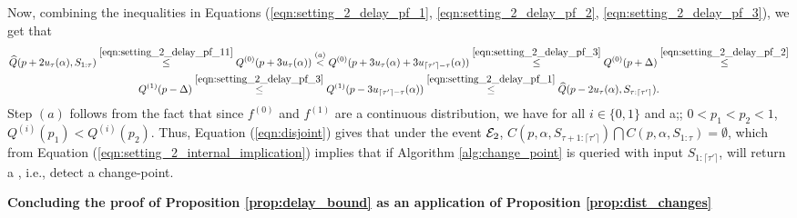 Now, combining the inequalities in Equations (\ref{eqn:setting_2_delay_pf_1}, \ref{eqn:setting_2_delay_pf_2}, \ref{eqn:setting_2_delay_pf_3}), we get that 
\begin{multline}
\widehat{Q}(p+2u_{\tau}(\alpha),S_{1:\tau}) \stackrel{\ref{eqn:setting_2_delay_pf_11}}{\leq} Q^{(0)}(p+3u_{\tau}(\alpha)) \stackrel{(a)}{<} Q^{(0)}(p+3u_{\tau}(\alpha) + 3u_{\lceil {\tau'} \rceil-\tau}(\alpha)) \stackrel{\ref{eqn:setting_2_delay_pf_3}}{\leq} Q^{(0)}(p+{\Delta}) \stackrel{\ref{eqn:setting_2_delay_pf_2}}{\leq} \\ Q^{(1)} ( p - {\Delta} ) \stackrel{\ref{eqn:setting_2_delay_pf_3}}{\leq} Q^{(1)}(p-3u_{\lceil {\tau'} \rceil-\tau}(\alpha)) \stackrel{\ref{eqn:setting_2_delay_pf_1}}{\leq} \widehat{Q}(p-2u_{\tau}(\alpha),S_{\tau:\lceil {\tau'} \rceil}).
\label{eqn:disjoint}
\end{multline}
Step $(a)$ follows from the fact that since $f^{(0)}$ and $f^{(1)}$ are a continuous distribution, we have for all $i \in \{0,1\}$ and a;; $0 < p_1 < p_2 < 1$, $Q^{(i)}(p_1) < Q^{(i)}(p_2)$. Thus, Equation (\ref{eqn:disjoint}) gives that under the event ${\mathcal{E}}_2$, $   C(p,\alpha,S_{\tau+1:\lceil \tau' \rceil}) \bigcap C(p,\alpha,S_{1:\tau}) = \emptyset$, which from Equation (\ref{eqn:setting_2_internal_implication}) implies that if Algorithm \ref{alg:change_point} is queried with input $S_{1:\lceil \tau' \rceil}$, will return a {}, i.e., detect a change-point.


\textbf{Concluding the proof of Proposition \ref{prop:delay_bound} as an application of Proposition \ref{prop:dist_changes}}


